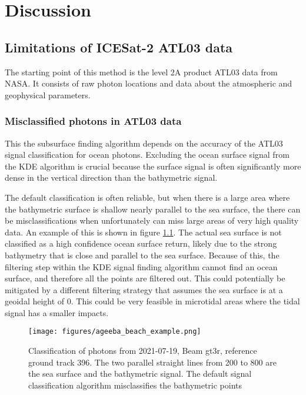 \chapter{Discussion}


\section{Limitations of ICESat-2 ATL03 data}
The starting point of this method is the level 2A product ATL03 data from NASA. It consists of raw photon locations and data about the atmospheric and geophysical parameters. 
\subsection{Misclassified photons in ATL03 data}

This the subsurface finding algorithm depends on the accuracy of the ATL03 signal classification for ocean photons. Excluding the ocean surface signal from the KDE algorithm is crucial because the surface signal is often significantly more dense in the vertical direction than the bathymetric signal.

The default classification is often reliable, but when there is a large area where the bathymetric surface is shallow nearly parallel to the sea surface, the there can be misclassifications when unfortunately can miss large areas of very high quality data. An example of this is shown in figure \ref{fig:ageeba_bad_classes}. The actual sea surface is not classified as a high confidence ocean surface return, likely due to the strong bathymetry that is close and parallel to the sea surface. Because of this, the filtering step within the KDE signal finding algorithm cannot find an ocean surface, and therefore all the points are filtered out. This could potentially be mitigated by a different filtering strategy that assumes the sea surface is at a geoidal height of 0. This could be very feasible in microtidal areas where the tidal signal has a smaller impacts.

\begin{figure}[htbp]
    \centering
    \texttt{[image: figures/ageeba\_beach\_example.png]}
    \caption{Classification of photons from 2021-07-19, Beam gt3r, reference ground track 396. The two parallel straight lines from 200 to 800 are the sea surface and the bathymetric signal. The default signal classification algorithm misclassifies the bathymetric points}
    \label{fig:ageeba_bad_classes}
\end{figure}



